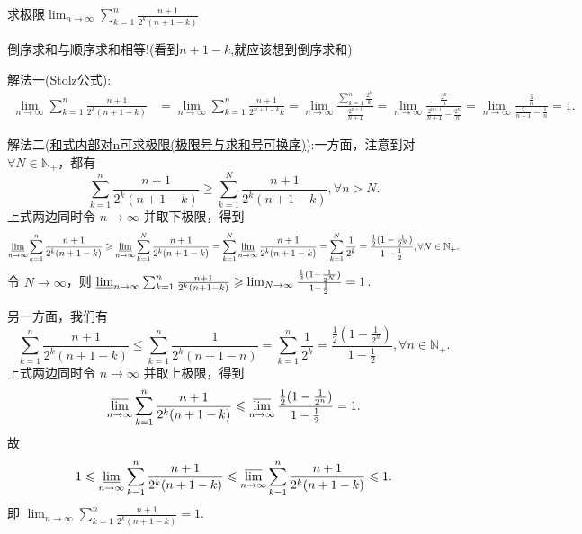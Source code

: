 \documentclass[../../main.tex]{subfiles}
\begin{document}
\begin{example}
求极限\(\lim_{n\rightarrow\infty}\sum_{k = 1}^{n}\frac{n + 1}{2^k(n + 1 - k)}\)
\end{example}
\begin{note}
倒序求和与顺序求和相等!(看到$n+1-k$,就应该想到倒序求和)
\end{note}
\begin{solution}
{\color{blue}解法一(Stolz公式):}
\begin{align*}
\lim_{n\rightarrow\infty}\sum_{k = 1}^{n}\frac{n + 1}{2^k(n + 1 - k)}&=\lim_{n\rightarrow\infty}\sum_{k = 1}^{n}\frac{n + 1}{2^{n + 1 - k}k}=\lim_{n\rightarrow\infty}\frac{\sum\limits_{k = 1}^{n}\frac{2^k}{k}}{\frac{2^{n + 1}}{n + 1}}=\lim_{n\rightarrow\infty}\frac{\frac{2^n}{n}}{\frac{2^{n + 1}}{n + 1}-\frac{2^n}{n}}=\lim_{n\rightarrow\infty}\frac{\frac{1}{n}}{\frac{2}{n + 1}-\frac{1}{n}} = 1.
\end{align*}

{\color{blue}解法二(\hyperref[section:和式内部对n可求极限(极限号与求和号可换序)]{和式内部对n可求极限(极限号与求和号可换序)}):}一方面，注意到对 \(\forall N\in \mathbb{N}_+\)，都有
\[
\sum_{k = 1}^n\frac{n + 1}{2^k(n + 1 - k)}\geqslant \sum_{k = 1}^N\frac{n + 1}{2^k(n + 1 - k)},\forall n > N.
\]
上式两边同时令 \(n\rightarrow \infty\) 并取下极限，得到
\begin{align*}
\varliminf_{n\rightarrow \infty}\sum_{k = 1}^n\frac{n + 1}{2^k(n + 1 - k)}\geqslant \varliminf_{n\rightarrow \infty}\sum_{k = 1}^N\frac{n + 1}{2^k(n + 1 - k)}
=\sum_{k = 1}^N\varliminf_{n\rightarrow \infty}\frac{n + 1}{2^k(n + 1 - k)}
=\sum_{k = 1}^N\frac{1}{2^k}
=\frac{\frac{1}{2}(1 - \frac{1}{2^N})}{1 - \frac{1}{2}},\forall N\in \mathbb{N}_+.
\end{align*}
令 \(N\rightarrow \infty\)，则 \(\varliminf_{n\rightarrow \infty}\sum_{k = 1}^n\frac{n + 1}{2^k(n + 1 - k)}\geqslant \lim_{N\rightarrow \infty}\frac{\frac{1}{2}(1 - \frac{1}{2^N})}{1 - \frac{1}{2}} = 1\).

另一方面，我们有
\[
\sum_{k = 1}^n\frac{n + 1}{2^k(n + 1 - k)}\leqslant \sum_{k = 1}^n\frac{1}{2^k(n + 1 - n)}=\sum_{k = 1}^n\frac{1}{2^k}=\frac{\frac{1}{2}(1 - \frac{1}{2^n})}{1 - \frac{1}{2}},\forall n\in \mathbb{N}_+.
\]
上式两边同时令 \(n\rightarrow \infty\) 并取上极限，得到
\[
\varlimsup_{n\rightarrow \infty}\sum_{k = 1}^n\frac{n + 1}{2^k(n + 1 - k)}\leqslant \varlimsup_{n\rightarrow \infty}\frac{\frac{1}{2}(1 - \frac{1}{2^n})}{1 - \frac{1}{2}} = 1.
\]
故
\[
1\leqslant \varliminf_{n\rightarrow \infty}\sum_{k = 1}^n\frac{n + 1}{2^k(n + 1 - k)}\leqslant \varlimsup_{n\rightarrow \infty}\sum_{k = 1}^n\frac{n + 1}{2^k(n + 1 - k)}\leqslant 1.
\]
即 \(\lim_{n\rightarrow \infty}\sum_{k = 1}^n\frac{n + 1}{2^k(n + 1 - k)} = 1\).
\end{solution}
\end{document}
